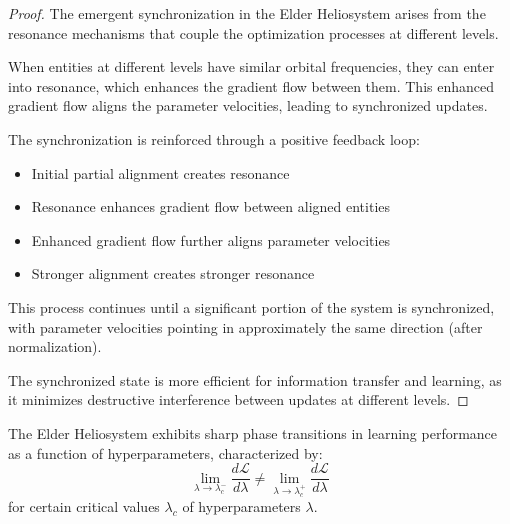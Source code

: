 \begin{proof}
The emergent synchronization in the Elder Heliosystem arises from the resonance mechanisms that couple the optimization processes at different levels.

When entities at different levels have similar orbital frequencies, they can enter into resonance, which enhances the gradient flow between them. This enhanced gradient flow aligns the parameter velocities, leading to synchronized updates.

The synchronization is reinforced through a positive feedback loop:
\begin{itemize}
    \item Initial partial alignment creates resonance
    \item Resonance enhances gradient flow between aligned entities
    \item Enhanced gradient flow further aligns parameter velocities
    \item Stronger alignment creates stronger resonance
\end{itemize}

This process continues until a significant portion of the system is synchronized, with parameter velocities pointing in approximately the same direction (after normalization).

The synchronized state is more efficient for information transfer and learning, as it minimizes destructive interference between updates at different levels.
\end{proof}

\begin{theorem}
The Elder Heliosystem exhibits sharp phase transitions in learning performance as a function of hyperparameters, characterized by:
\begin{equation}
\lim_{\lambda \to \lambda_c^-} \frac{d\mathcal{L}}{d\lambda} \neq \lim_{\lambda \to \lambda_c^+} \frac{d\mathcal{L}}{d\lambda}
\end{equation}
for certain critical values $\lambda_c$ of hyperparameters $\lambda$.
\end{theorem}

